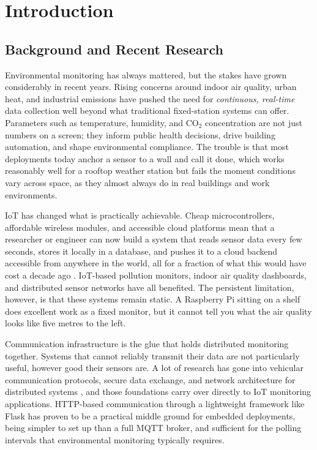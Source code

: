 
\chapter{Introduction}

\section{Background and Recent Research}

Environmental monitoring has always mattered, but the stakes have grown
considerably in recent years. Rising concerns around indoor air quality,
urban heat, and industrial emissions have pushed the need for
\emph{continuous, real-time} data collection well beyond what
traditional fixed-station systems can offer. Parameters such as
temperature, humidity, and CO$_2$ concentration are not just numbers on
a screen; they inform public health decisions, drive building
automation, and shape environmental compliance. The trouble is that
most deployments today anchor a sensor to a wall and call it done,
which works reasonably well for a rooftop weather station but fails
the moment conditions vary across space, as they almost always do in
real buildings and work environments.

IoT has changed what is practically achievable.
Cheap microcontrollers, affordable wireless modules, and accessible
cloud platforms mean that a researcher or engineer can now build a
system that reads sensor data every few seconds, stores it locally
in a database, and pushes it to a cloud backend accessible from
anywhere in the world, all for a fraction of what this would have
cost a decade ago \cite{r1,r2}. IoT-based pollution monitors, indoor
air quality dashboards, and distributed sensor networks have all
benefited. The persistent limitation, however, is that these systems
remain static. A Raspberry Pi sitting on a shelf does excellent work
as a fixed monitor, but it cannot tell you what the air quality
looks like five metres to the left.

Communication infrastructure is the glue that holds distributed
monitoring together. Systems that cannot reliably transmit their data
are not particularly useful, however good their sensors are. A lot of
research has gone into vehicular communication protocols, secure
data exchange, and network architecture for distributed systems
\cite{r3,r4}, and those foundations carry over directly to IoT
monitoring applications. HTTP-based communication through a lightweight
framework like Flask has proven to be a practical middle ground for
embedded deployments, being simpler to set up than a full MQTT broker,
and sufficient for the polling intervals that environmental monitoring
typically requires.

